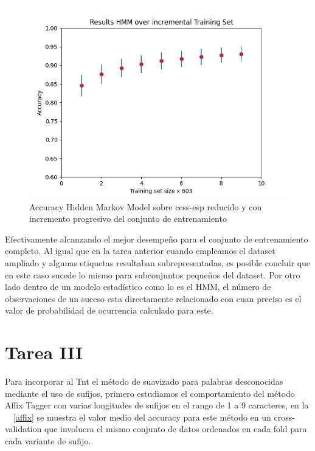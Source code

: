 \documentclass[11pt,a4paper]{report}
\begin{document}
		
		\begin{figure}[!thb]
			\begin{center}
				\includegraphics[scale=0.6]{images/incremental-set.png}
			\end{center}
			\caption{ Accuracy Hidden Markov Model sobre cess-esp reducido y con incremento progresivo del conjunto de entrenamiento}
			\label{incremental-set}
		\end{figure}
	Efectivamente alcanzando el mejor desempeño para el conjunto de entrenamiento completo. Al igual que en la tarea anterior cuando empleamos el dataset ampliado y algunas etiquetas resultaban subrepresentadas, es posible concluir que en este caso sucede lo mismo para subconjuntos pequeños del dataset. Por otro lado dentro de un modelo estadístico como lo es el HMM, el número de observaciones de un suceso esta directamente relacionado con cuan preciso es el valor de probabilidad de ocurrencia calculado para este.
	
	\section*{Tarea III}
	
	Para incorporar al Tnt el método de suavizado para palabras desconocidas mediante el uso de sufijos, primero estudiamos el comportamiento del método Affix Tagger  con varias longitudes de sufijos en el rango de 1 a 9 caracteres, en la ~\figurename~\ref{affix} se muestra el valor medio del accuracy para este método en un cross-validation que involucra el mismo conjunto de datos ordenados en cada fold para cada variante de sufijo.
	
\end{document}
